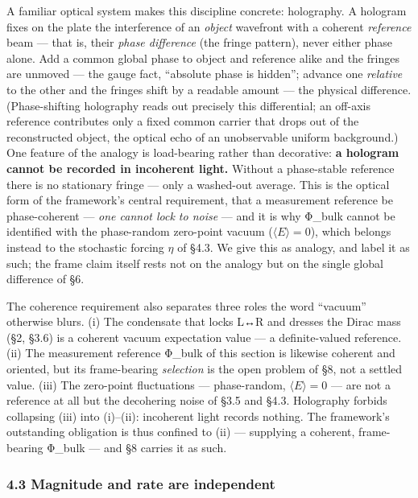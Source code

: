 \documentclass[
]{article}
\begin{document}
A familiar optical system makes this discipline concrete: holography. A
hologram fixes on the plate the interference of an \emph{object}
wavefront with a coherent \emph{reference} beam --- that is, their
\emph{phase difference} (the fringe pattern), never either phase alone.
Add a common global phase to object and reference alike and the fringes
are unmoved --- the gauge fact, ``absolute phase is hidden''; advance
one \emph{relative} to the other and the fringes shift by a readable
amount --- the physical difference. (Phase-shifting holography reads out
precisely this differential; an off-axis reference contributes only a
fixed common carrier that drops out of the reconstructed object, the
optical echo of an unobservable uniform background.) One feature of the
analogy is load-bearing rather than decorative: \textbf{a hologram
cannot be recorded in incoherent light.} Without a phase-stable
reference there is no stationary fringe --- only a washed-out average.
This is the optical form of the framework's central requirement, that a
measurement reference be phase-coherent --- \emph{one cannot lock to
noise} --- and it is why Φ\_bulk cannot be identified with the
phase-random zero-point vacuum (\(\langle E\rangle = 0\)), which belongs
instead to the stochastic forcing \(\eta\) of §4.3. We give this as
analogy, and label it as such; the frame claim itself rests not on the
analogy but on the single global difference of §6.

The coherence requirement also separates three roles the word ``vacuum''
otherwise blurs. (i) The condensate that locks L↔R and dresses the Dirac
mass (§2, §3.6) is a coherent vacuum expectation value --- a
definite-valued reference. (ii) The measurement reference Φ\_bulk of
this section is likewise coherent and oriented, but its frame-bearing
\emph{selection} is the open problem of §8, not a settled value. (iii)
The zero-point fluctuations --- phase-random, \(\langle E\rangle = 0\)
--- are not a reference at all but the decohering noise of §3.5 and
§4.3. Holography forbids collapsing (iii) into (i)--(ii): incoherent
light records nothing. The framework's outstanding obligation is thus
confined to (ii) --- supplying a coherent, frame-bearing Φ\_bulk --- and
§8 carries it as such.

\subsubsection{4.3 Magnitude and rate are
independent}\label{magnitude-and-rate-are-independent}
\end{document}
